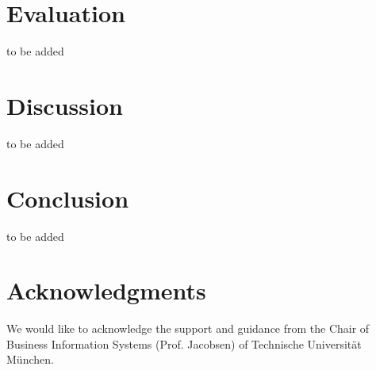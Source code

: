 \documentclass{sig-alternate}
\begin{document}
\section{Evaluation}
to be added
\section{Discussion}
to be added
\section{Conclusion}
to be added

\section{Acknowledgments}
We would like to acknowledge the support and guidance from the  Chair of Business Information Systems (Prof. Jacobsen) of Technische Universit{\"a}t M{\"u}nchen.
%

%
%

\end{document}
